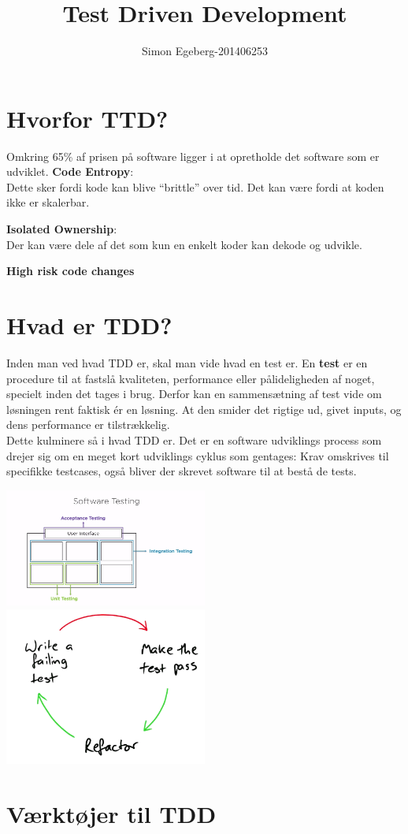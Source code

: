 \documentclass{article}
\title{Test Driven Development}
\author{Simon Egeberg-201406253}
\begin{document}
\maketitle
\section{Hvorfor TTD?}
Omkring 65\% af prisen på software ligger i at opretholde det software som er udviklet.
\textbf{Code Entropy}:\\
Dette sker fordi kode kan blive ``brittle'' over tid. Det kan være fordi at koden ikke er skalerbar.

\textbf{Isolated Ownership}:\\
Der kan være dele af det som kun en enkelt koder kan dekode og udvikle. 

\textbf{High risk code changes}

\section{Hvad er TDD?}
Inden man ved hvad TDD er, skal man vide hvad en test er. En \textbf{test} er en procedure til at fastslå kvaliteten, performance eller pålideligheden af noget, specielt inden det tages i brug.
Derfor kan en sammensætning af test vide om løsningen rent faktisk ér en løsning. At den smider det rigtige ud, givet inputs, og dens performance er tilstrækkelig. \\

Dette kulminere så i hvad TDD er. Det er en software udviklings process som drejer sig om en meget kort udviklings cyklus som gentages: Krav omskrives til specifikke testcases, også bliver der skrevet software til at bestå de tests.

\includegraphics[width = 0.5\textwidth]{softwaretesting.PNG}
\includegraphics[width = 0.5\textwidth]{redgreen.PNG}

\section{Værktøjer til TDD}
\end{document}
